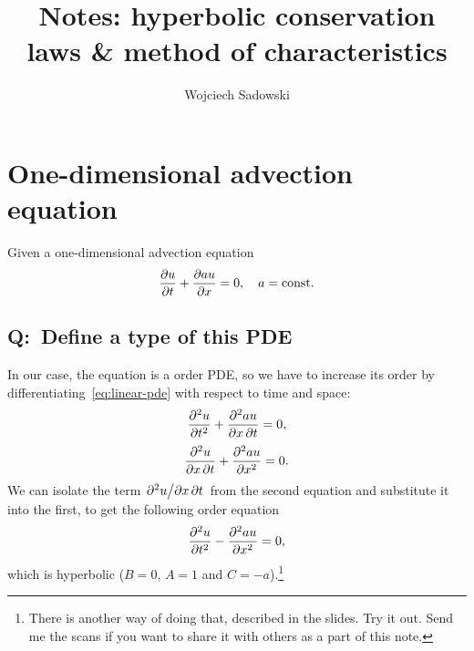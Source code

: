 \documentclass[justified, nobib, a4page]{tufte-handout}
\title{Notes: hyperbolic conservation laws \& method of characteristics}
\author[Wojciech Sadowski]{Wojciech Sadowski}
\newcommand{\Q}[1]{\subsection{Q:~{#1}}}
\begin{document}
\maketitle%

\tableofcontents
\section{One-dimensional advection equation}
Given a one-dimensional advection equation 
\begin{equation}
  \pdv{u}{t} + \pdv{au}{x} = 0, \quad a = \mathrm{const.}{}
  \label{eq:linear-pde}
\end{equation}

\Q{Define a type of this PDE}

In our case, the equation is a  order PDE, so we have to increase its
order
by differentiating~\cref{eq:linear-pde} with respect to time and space:
\[
  \pdv[order=2]{u}{t} + \pdv{au}{x,t} = 0,
\]
\[
  \pdv{u}{x,t} + \pdv[order=2]{au}{x} = 0.
\]
We can isolate the term \(\pdv{u}/{x,t}\) from the second equation and substitute 
it into the first, to get the following  order equation
\[
  \pdv[order=2]{u}{t} - \pdv[order=2]{au}{x} = 0,
\]
which is hyperbolic (\(B = 0\), \(A=1\) and \(C=-a\)).\footnote{
  There is another way of doing that, described in the  slides. Try
  it out. Send me the scans if you want to share it with others as a part of
  this note.}
\end{document}
